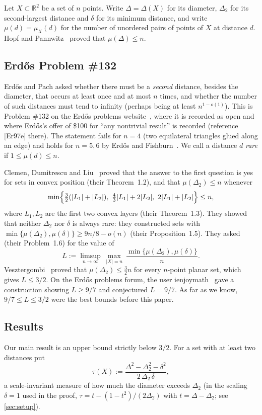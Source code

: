 \documentclass[11pt]{amsart}
\theoremstyle{definition}
\theoremstyle{remark}
\newcommand{\R}{\mathbb{R}}
\newcommand{\Dt}{\Delta_2}
\newcommand{\mult}{\mu}
\begin{document}
Let $X\subset\R^2$ be a set of $n$ points. Write $\Delta=\Delta(X)$ for its diameter, $\Dt$ for its second-largest distance and $\delta$ for its minimum distance, and write $\mult(d)=\mult_X(d)$ for the number of unordered pairs of points of $X$ at distance $d$. Hopf and Pannwitz~\cite{HP34} proved that $\mult(\Delta)\le n$.

\subsection*{Erd\H{o}s Problem \#132}
Erd\H{o}s and Pach asked whether there must be a \emph{second} distance, besides the diameter, that occurs at least once and at most $n$ times, and whether the number of such distances must tend to infinity (perhaps being at least $n^{1-o(1)}$). This is Problem \#132 on the Erd\H{o}s problems website~\cite{EP132}, where it is recorded as open and where Erd\H{o}s's offer of \$100 for ``any nontrivial result'' is recorded (reference [Er97e] there). The statement fails for $n=4$ (two equilateral triangles glued along an edge) and holds for $n=5,6$ by Erd\H{o}s and Fishburn~\cite{EF95a}. We call a distance $d$ \emph{rare} if $1\le\mult(d)\le n$.

Clemen, Dumitrescu and Liu~\cite{CDL25} proved that the answer to the first question is yes for sets in convex position (their Theorem~1.2), and that $\mult(\Dt)\le n$ whenever
\begin{equation}\label{eq:cdl13}
\min\Bigl\{\tfrac32(|L_1|+|L_2|),\ \tfrac43|L_1|+2|L_2|,\ 2|L_1|+|L_2|\Bigr\}\le n,
\end{equation}
where $L_1,L_2$ are the first two convex layers (their Theorem~1.3). They showed that neither $\Dt$ nor $\delta$ is always rare: they constructed sets with $\min\{\mult(\Dt),\mult(\delta)\}\ge 9n/8-o(n)$ (their Proposition~1.5). They asked (their Problem~1.6) for the value of
\[
L:=\limsup_{n\to\infty}\ \max_{|X|=n}\ \frac{\min\{\mult(\Dt),\mult(\delta)\}}{n}.
\]
Vesztergombi~\cite{Ve87} proved that $\mult(\Dt)\le\frac32 n$ for every $n$-point planar set, which gives $L\le 3/2$. On the Erd\H{o}s problems forum, the user ienjoymath~\cite{ienjoymath} gave a construction showing $L\ge 9/7$ and conjectured $L=9/7$. As far as we know, $9/7\le L\le 3/2$ were the best bounds before this paper.

\subsection*{Results}
Our main result is an upper bound strictly below $3/2$. For a set with at least two distances put
\[
\tau(X):=\frac{\Delta^2-\Dt^2-\delta^2}{2\,\Dt\,\delta},
\]
a scale-invariant measure of how much the diameter exceeds $\Dt$ (in the scaling $\delta=1$ used in the proof, $\tau=t-(1-t^2)/(2\Dt)$ with $t=\Delta-\Dt$; see \cref{sec:setup}).
\end{document}
